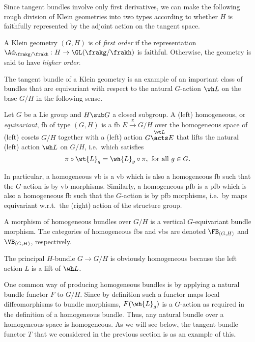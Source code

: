 Since tangent bundles involve only first derivatives, we can make the following rough division of Klein geometries into two types according to whether $H$ is faithfully represented by the adjoint action on the tangent space.

\begin{defn}
    A Klein geometry $(G,H)$ is of \emph{first order} if the representation $\Ad_{\frakg\slash\frakh}:H\to \GL(\frakg\slash\frakh)$ is faithful. Otherwise, the geometry is said to have \emph{higher order}.
\end{defn}


The tangent bundle of a Klein geometry is an example of an important class of bundles that are equivariant with respect to the natural $G$-action $\wh L$ on the base $G\slash H$ in the following sense.


\begin{defn}
    Let $G$ be a Lie group and $H\sub G$ a closed subgroup. A (left) homogeneous, or \emph{equivariant}, \gls{fb} of type $(G,H)$ is a \gls{fb} $E\overset{\pi}{\to}G\slash H$ over the homogeneous space of (left) cosets $G\slash H$ together with a (left) action $G\overset{\wt L}{\acts} E$ that lifts the natural (left) action $\wh L$ on $G\slash H$, i.e.\ which satisfies \[\pi\circ \wt{L}_g=\wh{L}_g\circ \pi,\text{ for all } g\in G.\] 

    In particular, a homogeneous \gls{vb} is a \gls{vb} which is also a homogeneous \gls{fb} such that the $G$-action is by \gls{vb} morphisms. Similarly, a homogeneous \gls{pfb} is a \gls{pfb} which is also a homogeneous \gls{fb} such that the $G$-action is by \gls{pfb} morphisms, i.e.\ by maps equivariant w.r.t.\ the (right) action of the structure group.

    A morphism of homogeneous bundles over $G\slash H$ is a vertical $G$-equivariant bundle morphism. The categories of homogeneous \glspl{fb} and \glspl{vb} are denoted $\FB_{(G,H)}$ and $\VB_{(G,H)}$, respectively. 
\end{defn}

\begin{example}
    The principal $H$-bundle $G\to G\slash H$ is obviously homogeneous because the left action $L$ is a lift of $\wh L$.
\end{example}

One common way of producing homogeneous bundles is by applying a natural bundle functor $F$ to $G\slash H$. Since by definition such a functor maps local diffeomorphisms to bundle morphisms, $F(\wh{L}_g)$ is a $G$-action as required in the definition of a homogeneous bundle. Thus, any natural bundle over a homogeneous space is homogeneous. As we will see below, the tangent bundle functor $T$ that we considered in the previous section is as an example of this.


